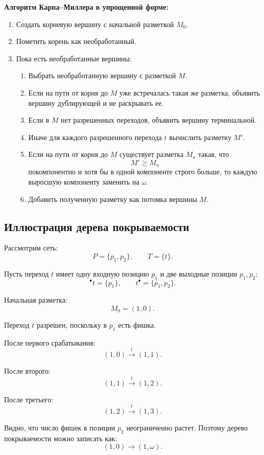 \documentclass[12pt,a4paper]{article}
\begin{document}
\textbf{Алгоритм Карпа--Миллера в упрощенной форме:}

\begin{enumerate}
    \item Создать корневую вершину с начальной разметкой $M_0$.
    \item Пометить корень как необработанный.
    \item Пока есть необработанные вершины:
    \begin{enumerate}
        \item Выбрать необработанную вершину с разметкой $M$.
        \item Если на пути от корня до $M$ уже встречалась такая же разметка, объявить вершину дублирующей и не раскрывать ее.
        \item Если в $M$ нет разрешенных переходов, объявить вершину терминальной.
        \item Иначе для каждого разрешенного перехода $t$ вычислить разметку $M'$.
        \item Если на пути от корня до $M$ существует разметка $M_a$ такая, что
        \[
        M' \ge M_a
        \]
        покомпонентно и хотя бы в одной компоненте строго больше, то каждую выросшую компоненту заменить на $\omega$.
        \item Добавить полученную разметку как потомка вершины $M$.
    \end{enumerate}
\end{enumerate}

\subsection{Иллюстрация дерева покрываемости}

Рассмотрим сеть:
\[
P=\{p_1,p_2\},
\qquad
T=\{t\}.
\]

Пусть переход $t$ имеет одну входную позицию $p_1$ и две выходные позиции $p_1,p_2$:
\[
{}^\bullet t = \{p_1\},
\qquad
t^\bullet = \{p_1,p_2\}.
\]

Начальная разметка:
\[
M_0=(1,0).
\]

Переход $t$ разрешен, поскольку в $p_1$ есть фишка.

После первого срабатывания:
\[
(1,0) \xrightarrow{t} (1,1).
\]

После второго:
\[
(1,1) \xrightarrow{t} (1,2).
\]

После третьего:
\[
(1,2) \xrightarrow{t} (1,3).
\]

Видно, что число фишек в позиции $p_2$ неограниченно растет. Поэтому дерево покрываемости можно записать как:
\[
(1,0) \to (1,\omega).
\]
\end{document}
